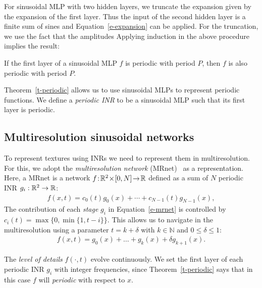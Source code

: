 For sinusoidal MLP with two hidden layers, we truncate the expansion given by the expansion of the first layer. Thus the input of the second hidden layer is a finite sum of sines and Equation~\ref{e-expansion} can be applied.
For the truncation, we use the fact that the amplitudes
Applying induction in the above procedure implies the result:
\begin{theorem}
\label{t-periodic}
    If the first layer of a sinusoidal MLP $f$ is periodic with period $P$, then $f$ is also periodic with period $P$.
\end{theorem}

Theorem~\ref{t-periodic} allows us to use sinusoidal MLPs to represent periodic functions. 
We define a \textit{periodic INR} to be a sinusoidal MLP such that its first layer is periodic. 

\subsection{Multiresolution sinusoidal networks}\label{s-mr-networks}
\label{s-multiresolution}
To represent textures using INRs we need to represent them in multiresolution. For this, we adopt the \textit{multiresolution network} (MRnet)~\cite{paz2022,paz2023mr} as a representation. Here, a MRnet is a network $f\!:\!\mathbb{R}^2\!\times\! [0,N]\!\to\! \mathbb{R}$ defined as a sum of $N$ periodic INR $g_i:\mathbb{R}^2\to\mathbb{R}$:
\begin{align}\label{e-mrnet}
f(x,t) = c_0(t)g_0(x) + \cdots + c_{N-1}(t)g_{N-1}(x),
\end{align}
The contribution of each \textit{stage} $g_i$ in Equation~\ref{e-mrnet} is controlled by $
c_i(t)\!=\!\max\big\{0, \min\big\{1, t-i\big\}\big\}.$
This allows us to navigate in the multiresolution using a parameter $t\!=\!k+\delta$ with $k\in\mathbb{N}$ and $0\leq\delta\leq 1$:
\begin{align}\label{e-mrnet2}
f(x,t)=g_0(x)+\dots + g_k(x)+\delta g_{k+1}(x).
\end{align}

The \textit{level of details} $f(\cdot, t)$ evolve continuously.
We set the first layer of each periodic INR $g_i$ with integer frequencies, since Theorem~\ref{t-periodic} says that in this case $f$ will \textit{periodic} with respect to $x$.

